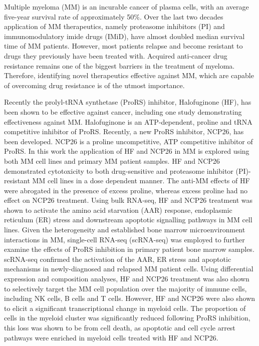 
Multiple myeloma (MM) is an incurable cancer of plasma cells, with an average five-year survival rate of approximately 50\%.
Over the last two decades application of MM therapeutics, namely proteasome inhibitors (PI) and immunomodulatory imide drugs (IMiD), have almost doubled median survival time of MM patients.
However, most patients relapse and become resistant to drugs they previously have been treated with.
Acquired anti-cancer drug resistance remains one of the biggest barriers in the treatment of myeloma.
Therefore, identifying novel therapeutics effective against MM, which are capable of overcoming drug resistance is of the utmost importance.

Recently the prolyl-tRNA synthetase (ProRS) inhibitor, Halofuginone (HF), has been shown to be effective against cancer, including one study demonstrating effectiveness against MM\@.
Halofuginone is an ATP-dependent, proline and tRNA competitive inhibitor of ProRS\@.
Recently, a new ProRS inhibitor, NCP26, has been developed.
NCP26 is a proline uncompetitive, ATP competitive inhibitor of ProRS\@.
In this work the application of HF and NCP26 in MM is explored using both MM cell lines and primary MM patient samples.
HF and NCP26 demonstrated cytotoxicity to both drug-sensitive and proteasome inhibitor (PI)-resistant MM cell lines in a dose dependent manner.
The anti-MM effects of HF were abrogated in the presence of excess proline, whereas excess proline had no effect on NCP26 treatment.
Using bulk RNA-seq, HF and NCP26 treatment was shown to activate the amino acid starvation (AAR) response, endoplasmic reticulum (ER) stress and downstream apoptotic signalling pathways in MM cell lines.
Given the heterogeneity and established bone marrow microenvironment interactions in MM, single-cell RNA-seq (scRNA-seq) was employed to further examine the effects of ProRS inhibition in primary patient bone marrow samples.
scRNA-seq confirmed the activation of the AAR, ER stress and apoptotic mechanisms in newly-diagnosed and relapsed MM patient cells.
Using differential expression and composition analyses, HF and NCP26 treatment was also shown to selectively target the MM cell population over the majority of immune cells, including NK cells, B cells and T cells.
However, HF and NCP26 were also shown to elicit a significant transcriptional change in myeloid cells.
The proportion of cells in the myeloid cluster was significantly reduced following ProRS inhibition, this loss was shown to be from cell death, as apoptotic and cell cycle arrest pathways were enriched in myeloid cells treated with HF and NCP26.

